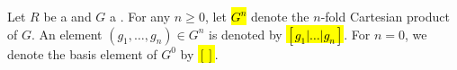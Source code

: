 \begin{notation} \label{notation:basis_elements_for_n_fold_cartesian_product_of_a_group}
Let $R$ be a  and $G$ a . 
For any $n \geq 0$, let \hl{$G^{n}$} denote the $n$-fold Cartesian product of $G$. An element $(g_1, \dots, g_n) \in G^n$ is denoted by \hl{$[g_1 | \dots | g_n]$}. For $n=0$, we denote the basis element of $G^0$ by \hl{$[]$}.
\end{notation}